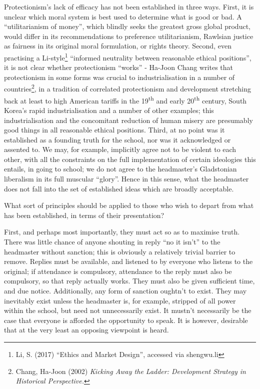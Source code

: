 \documentclass[10pt,a4paper]{article}
\newcounter{count}
\begin{document}
\begin{multicols}{2}
	Protectionism's lack of efficacy has not been established in three ways.
	First, it is unclear which moral system is best used to determine what
	is good or bad. A ``utilitarianism of money'', which blindly seeks the
	greatest gross global product, would differ in its recommendations to
	preference utilitarianism, Rawlsian justice as fairness in its original
	moral formulation, or rights theory. Second, even practising a
	Li-style\footnote{Li, S. (2017) ``Ethics and Market Design'', accessed
		via shengwu.li} ``informed neutrality between reasonable ethical
	positions'', it is not clear whether protectionism ``works'' - Ha-Joon
	Chang writes that protectionism in some forms was crucial to
	industrialisation in a number of countries\footnote{Chang, Ha-Joon
		(2002) \textit{Kicking Away the Ladder: Development Strategy in
			Historical Perspective.}}, in a tradition of correlated protectionism
	and development stretching back at least to high American tariffs in the
	19\textsuperscript{th} and early 20\textsuperscript{th} century, South
	Korea's rapid industrialisation and a number of other examples; this
	industrialisation and the concomitant reduction of human misery are
	presumably good things in all reasonable ethical positions. Third, at no
	point was it established as a founding truth for the school, nor was it
	acknowledged or assented to. We may, for example, implicitly agree not
	to be violent to each other, with all the constraints on the full
	implementation of certain ideologies this entails, in going to school;
	we do not agree to the headmaster's Gladstonian liberalism in its full
	muscular ``glory''. Hence in this sense, what the headmaster does not
	fall into the set of established ideas which are broadly acceptable.
	
	What sort of principles should be applied to those who wish to depart
	from what has been established, in terms of their presentation?
	
	First, and perhaps most importantly, they must act so as to maximise
	truth. There was little chance of anyone shouting in reply ``no it
	isn't'' to the headmaster without sanction; this is obviously a
	relatively trivial barrier to remove. Replies must be available, and
	listened to by everyone who listens to the original; if attendance is
	compulsory, attendance to the reply must also be compulsory, so that
	reply actually works. They must also be given sufficient time, and due
	notice. Additionally, any form of sanction oughtn't to exist. They may
	inevitably exist unless the headmaster is, for example, stripped of all
	power within the school, but need not unnecessarily exist. It mustn't
	necessarily be the case that everyone is afforded the opportunity to
	speak. It is however, desirable that at the very least an opposing
	viewpoint is heard.
	

\end{multicols}
\end{document}
